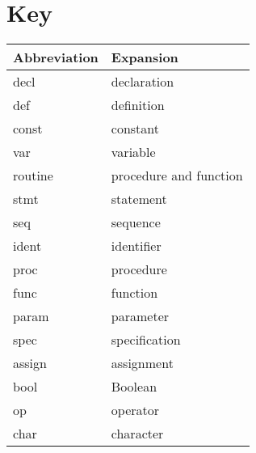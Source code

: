 \documentclass{article}
\begin{document}
\section{Key}

\begin{center}
  \begin{tabular}{l l}
    Abbreviation & Expansion \\
    \midrule
    decl & declaration \\
    def & definition \\
    const & constant \\
    var & variable \\
    routine & procedure and function \\
    stmt & statement \\
    seq & sequence \\
    ident & identifier \\
    proc & procedure \\
    func & function \\
    param & parameter \\
    spec & specification \\
    assign & assignment \\
    bool & Boolean \\
    op & operator \\
    char & character
  \end{tabular}
\end{center}
\end{document}
